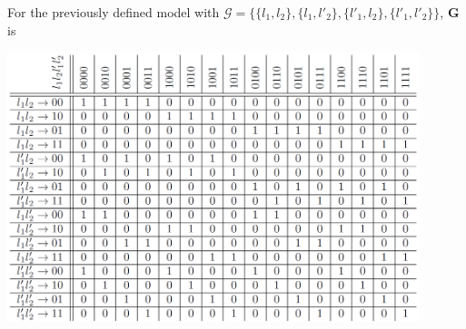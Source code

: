 \begin{frame}
For the previously defined model with $\mathcal{G} = \{\{l_1,l_2 \},\{l_1,l'_2 \},\{l'_1,l_2\},\{l'_1,l'_2\} \}$, $\mathbf{G}$ is
\begin{center}
\includegraphics[width=0.9\textwidth]{fig/Gmat.png}
\end{center}
\end{frame}
